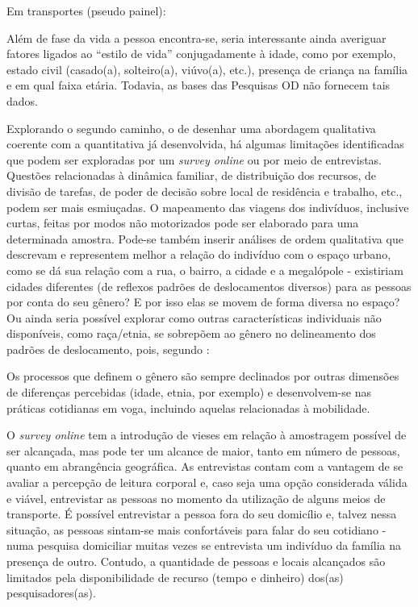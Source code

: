 Em transportes (pseudo painel): \cite{DARGAY1999,DARGAY2002,BRESSON2004}

Além de fase da vida a pessoa encontra-se, seria interessante ainda averiguar fatores ligados ao ``estilo de vida'' conjugadamente à idade, como por exemplo, estado civil (casado(a), solteiro(a), viúvo(a), etc.), presença de criança na família e em qual faixa etária. Todavia, as bases das Pesquisas OD não fornecem tais dados.



Explorando o segundo caminho, o de desenhar uma abordagem qualitativa coerente com a quantitativa já desenvolvida, há algumas limitações identificadas que podem ser exploradas por um \emph{survey online} ou por meio de entrevistas. Questões relacionadas à dinâmica familiar, de distribuição dos recursos, de divisão de tarefas, de poder de decisão sobre local de residência e trabalho, etc., podem ser mais esmiuçadas. O mapeamento das viagens dos indivíduos, inclusive curtas, feitas por modos não motorizados pode ser elaborado para uma determinada amostra. Pode-se também inserir análises de ordem qualitativa que descrevam e representem melhor a relação do indivíduo com o espaço urbano, como se dá sua relação com a rua, o bairro, a cidade e a megalópole - existiriam cidades diferentes (de reflexos padrões de deslocamentos diversos) para as pessoas por conta do seu gênero? E por isso elas se movem de forma diversa no espaço? Ou ainda seria possível explorar como outras características individuais não disponíveis, como raça/etnia, se sobrepõem ao gênero no delineamento dos padrões de deslocamento, pois, segundo :

\begin{citacao}
Os processos que definem o gênero são sempre declinados  por outras dimensões de diferenças percebidas (idade, etnia, por exemplo) e desenvolvem-se nas práticas cotidianas em voga, incluindo aquelas relacionadas à mobilidade.
\end{citacao}

O \emph{survey online} tem a introdução de vieses em relação à amostragem possível de ser alcançada, mas pode ter um alcance de maior, tanto em número de pessoas, quanto em abrangência geográfica. 
As entrevistas contam com a vantagem de se avaliar a percepção de leitura corporal e, caso seja uma opção considerada válida e viável, entrevistar as pessoas no momento da utilização de alguns meios de transporte. 
É possível entrevistar a pessoa fora do seu domicílio e, talvez nessa situação, as pessoas sintam-se mais confortáveis para falar do seu cotidiano - numa pesquisa domiciliar muitas vezes se entrevista um indivíduo da família na presença de outro. Contudo, a quantidade de pessoas e locais alcançados são limitados pela disponibilidade de recurso (tempo e dinheiro) dos(as) pesquisadores(as). 

